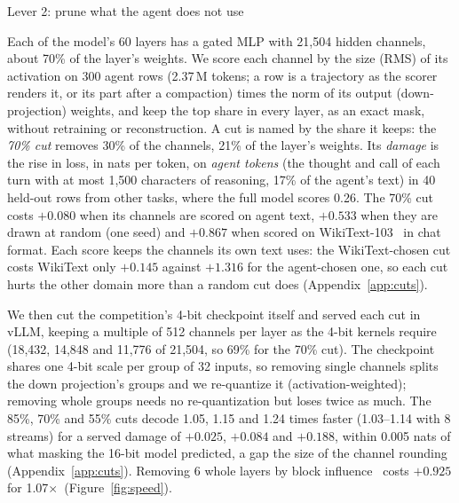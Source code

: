 \documentclass[10pt,twocolumn]{article}
\makeatletter
\newcommand{\X}{\ensuremath{\times}}
\renewcommand\section{\@startsection{section}{1}{\z@}{-2.2ex \@plus -.6ex \@minus -.2ex}{1.1ex \@plus .2ex}%
  {\normalfont\large\bfseries}}
\renewcommand\paragraph{\@startsection{paragraph}{4}{\z@}{1.4ex \@plus .5ex \@minus .2ex}{-1em}{\normalfont\normalsize\bfseries}}
\makeatother
\begin{document}
\section{Lever 2: prune what the agent does not use}\label{sec:prune}

Each of the model's 60 layers has a gated MLP with 21,504 hidden channels, about 70\% of the layer's weights. We score
each channel by the size (RMS) of its activation on 300 agent rows (2.37\,M tokens; a row is a trajectory as the scorer
renders it, or its part after a compaction) times the norm of its output (down-projection) weights, and keep the top
share in every layer, as an exact mask, without retraining or reconstruction. A cut is named by the share it keeps: the
\emph{70\% cut} removes 30\% of the channels, 21\% of the layer's weights. Its \emph{damage} is the rise in loss, in nats
per token, on \emph{agent tokens} (the thought and call of each turn with at most 1,500 characters of reasoning, 17\%
of the agent's text) in 40 held-out rows from other tasks, where the full model scores 0.26. The 70\% cut costs
$+0.080$ when its channels are scored on agent text, $+0.533$ when they are drawn at random (one seed) and $+0.867$ when scored
on WikiText-103~\citep{merity2016pointer} in chat format. Each score keeps the channels its own text uses: the
WikiText-chosen cut costs WikiText only $+0.145$ against $+1.316$ for the agent-chosen one, so each cut hurts the
other domain more than a random cut does (Appendix~\ref{app:cuts}).

\paragraph{Real 4-bit cuts.} We then cut the competition's 4-bit checkpoint itself and served each cut in vLLM,
keeping a multiple of 512 channels per layer as the 4-bit kernels require (18,432, 14,848 and 11,776 of 21,504, so
69\% for the 70\% cut). The checkpoint shares one 4-bit scale per group of 32 inputs, so removing single channels splits the
down projection's groups and we re-quantize it (activation-weighted); removing whole groups needs no re-quantization but loses twice as much. The 85\%, 70\% and 55\%
cuts decode 1.05, 1.15 and 1.24 times faster (1.03--1.14 with 8 streams) for a served damage of $+0.025$, $+0.084$ and
$+0.188$, within 0.005 nats of what masking the 16-bit model predicted, a gap the size of the channel rounding
(Appendix~\ref{app:cuts}). Removing 6 whole layers by block influence~\citep{men2024shortgpt} costs $+0.925$ for
1.07\X\ (Figure~\ref{fig:speed}).
\end{document}
